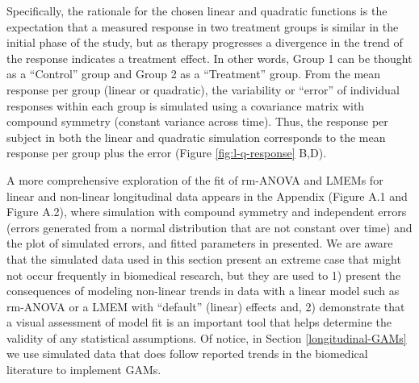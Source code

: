 \documentclass[
]{article}
\begin{document}
Specifically, the rationale for the chosen linear and quadratic functions is the expectation that a measured response in two treatment groups is similar in the initial phase of the study, but as therapy progresses a divergence in the trend of the response indicates a treatment effect. In other words, Group 1 can be thought as a ``Control'' group and Group 2 as a ``Treatment'' group. From the mean response per group (linear or quadratic), the variability or ``error'' of individual responses within each group is simulated using a covariance matrix with compound symmetry (constant variance across time). Thus, the response per subject in both the linear and quadratic simulation corresponds to the mean response per group plus the error (Figure \ref{fig:l-q-response} B,D).

A more comprehensive exploration of the fit of rm-ANOVA and LMEMs for linear and non-linear longitudinal data appears in the Appendix (Figure A.1 and Figure A.2), where simulation with compound symmetry and independent errors (errors generated from a normal distribution that are not constant over time) and the plot of simulated errors, and fitted parameters in presented. We are aware that the simulated data used in this section present an extreme case that might not occur frequently in biomedical research, but they are used to 1) present the consequences of modeling non-linear trends in data with a linear model such as rm-ANOVA or a LMEM with ``default'' (linear) effects and, 2) demonstrate that a visual assessment of model fit is an important tool that helps determine the validity of any statistical assumptions. Of notice, in Section \ref{longitudinal-GAMs} we use simulated data that does follow reported trends in the biomedical literature to implement GAMs.
\end{document}
